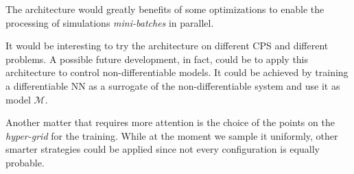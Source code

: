 The architecture would greatly benefits of some optimizations to enable the processing of simulations \textit{mini-batches} in parallel.

It would be interesting to try the architecture on different CPS and different problems.
A possible future development, in fact, could be to apply this architecture to control non-differentiable models.
It could be achieved by training a differentiable NN as a surrogate of the non-differentiable system and use it as model $\mathcal{M}$.

Another matter that requires more attention is the choice of the points on the \textit{hyper-grid} for the training.
While at the moment we sample it uniformly, other smarter strategies could be applied since not every configuration is equally probable.